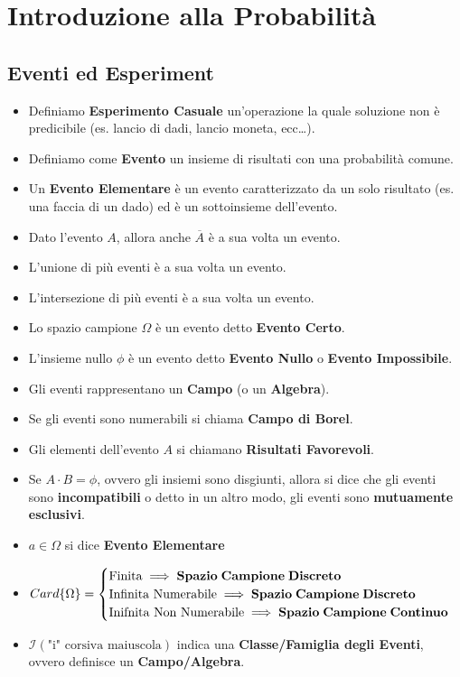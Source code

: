 \documentclass{article}
\begin{document}
\section{Introduzione alla Probabilità}

\subsection{Eventi ed Esperiment}
\begin{itemize}
    \item Definiamo \textbf{Esperimento Casuale} un’operazione la quale soluzione non è predicibile (es. lancio di dadi, lancio moneta, ecc…).
    \item Definiamo come \textbf{Evento} un insieme di risultati con una probabilità comune.
    \item Un \textbf{Evento Elementare} è un evento caratterizzato da un solo risultato (es. una faccia di un dado) ed è un sottoinsieme dell’evento.
    \item Dato l’evento $A$, allora anche $\overline A$ è a sua volta un evento.
    \item L’unione di più eventi è a sua volta un evento.
    \item L’intersezione di più eventi è a sua volta un evento.
    \item Lo spazio campione $\Omega$ è un evento detto \textbf{Evento Certo}.
    \item L’insieme nullo $\phi$ è un evento detto \textbf{Evento Nullo} o \textbf{Evento Impossibile}.
    \item Gli eventi rappresentano un \textbf{Campo} (o un \textbf{Algebra}).
    \item Se gli eventi sono numerabili si chiama \textbf{Campo di Borel}.
    \item Gli elementi dell’evento $A$ si chiamano \textbf{Risultati Favorevoli}.
    \item Se $A \cdot B = \phi$, ovvero gli insiemi sono disgiunti, allora si dice che gli eventi sono \textbf{incompatibili} o detto in un altro modo, gli eventi sono \textbf{mutuamente esclusivi}.
    \item $a \in \Omega$ si dice \textbf{Evento Elementare}
    \item $Card\{ \Omega \} = \begin{cases} 
        \text{Finita}  \implies \bf{Spazio} \; Campione \; Discreto\\
        \text{Infinita Numerabile} \implies \bf{Spazio} \; Campione \; Discreto\\
        \text{Inifnita Non Numerabile} \implies \bf{Spazio} \; Campione \; Continuo
        \end{cases}$
    \item $\mathcal{I} \left( \text{"i" corsiva maiuscola} \right)$ indica una \textbf{Classe/Famiglia degli Eventi}, ovvero definisce un \textbf{Campo/Algebra}.
\end{itemize}
\end{document}
